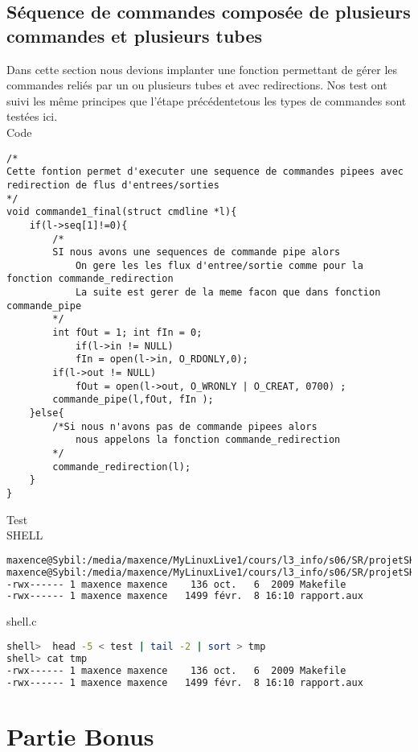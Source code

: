 \documentclass{report}
\begin{document}
		\section{S\'equence de commandes compos\'ee de plusieurs commandes et plusieurs tubes}
		Dans cette section nous devions implanter une fonction permettant de g\'erer les commandes reli\'es par un ou plusieurs tubes et avec redirections. Nos test ont suivi les m\^eme principes que l'\'etape pr\'ec\'edentetous les types de commandes sont test\'ees ici. \\ Code
			\begin{lstlisting}
/*
Cette fontion permet d'executer une sequence de commandes pipees avec redirection de flus d'entrees/sorties 
*/
void commande1_final(struct cmdline *l){
	if(l->seq[1]!=0){
		/*
		SI nous avons une sequences de commande pipe alors
			On gere les les flux d'entree/sortie comme pour la fonction commande_redirection
			La suite est gerer de la meme facon que dans fonction commande_pipe
		*/
		int fOut = 1; int fIn = 0;
			if(l->in != NULL)
			fIn = open(l->in, O_RDONLY,0);
		if(l->out != NULL)
			fOut = open(l->out, O_WRONLY | O_CREAT, 0700) ;
		commande_pipe(l,fOut, fIn );
	}else{
		/*Si nous n'avons pas de commande pipees alors
			nous appelons la fonction commande_redirection
		*/ 
		commande_redirection(l);
	}
}

			\end{lstlisting}
			Test \\ SHELL
			\begin{lstlisting}[frame=single,basicstyle=\footnotesize,language=bash]
maxence@Sybil:/media/maxence/MyLinuxLive1/cours/l3_info/s06/SR/projetSHELL$ head -5 < test | tail -2 | sort > tmp2
maxence@Sybil:/media/maxence/MyLinuxLive1/cours/l3_info/s06/SR/projetSHELL$ cat tmp2
-rwx------ 1 maxence maxence    136 oct.   6  2009 Makefile
-rwx------ 1 maxence maxence   1499 févr.  8 16:10 rapport.aux
			\end{lstlisting}
			shell.c
			\begin{lstlisting}[frame=single,basicstyle=\footnotesize,language=bash]
shell>  head -5 < test | tail -2 | sort > tmp
shell> cat tmp
-rwx------ 1 maxence maxence    136 oct.   6  2009 Makefile
-rwx------ 1 maxence maxence   1499 févr.  8 16:10 rapport.aux
			\end{lstlisting}
	\chapter{Partie Bonus}
\end{document}
